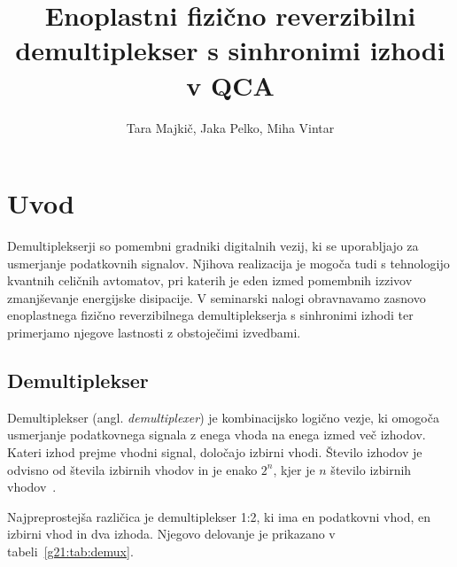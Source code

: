 \documentclass[graybox, envcountchap]{svmult}
\title{Enoplastni fizično reverzibilni demultiplekser s sinhronimi izhodi v QCA}
\author{Tara Majkič, Jaka Pelko, Miha Vintar}
\begin{document}
\maketitle


\section{Uvod}
\label{g21:sec:uvod}

Demultiplekserji so pomembni gradniki digitalnih vezij, ki se uporabljajo za usmerjanje podatkovnih signalov. Njihova realizacija je mogoča tudi s tehnologijo kvantnih celičnih avtomatov, pri katerih je eden izmed pomembnih izzivov zmanjševanje energijske disipacije. V seminarski nalogi obravnavamo zasnovo enoplastnega fizično reverzibilnega demultiplekserja s sinhronimi izhodi ter primerjamo njegove lastnosti z obstoječimi izvedbami.

\subsection{Demultiplekser}
\label{g21:sec:demux}

Demultiplekser (angl. \emph{demultiplexer}) je kombinacijsko logično vezje, ki omogoča usmerjanje podatkovnega signala z enega vhoda na enega izmed več izhodov. Kateri izhod prejme vhodni signal, določajo izbirni vhodi. Število izhodov je odvisno od števila izbirnih vhodov in je enako $2^n$, kjer je $n$ število izbirnih vhodov~\cite{dsouza2026}.

Najpreprostejša različica je demultiplekser 1:2, ki ima en podatkovni vhod, en izbirni vhod in dva izhoda. Njegovo delovanje je prikazano v tabeli~\ref{g21:tab:demux}.
\end{document}
